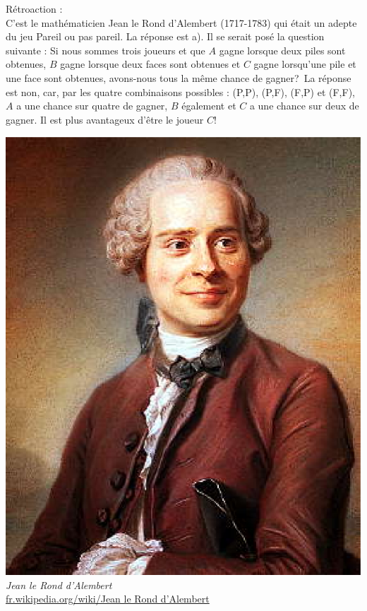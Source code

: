 \documentclass[letterpaper, 12pt]{article}
\begin{document}
R\'etroaction :\\
C'est le math\'ematicien Jean le Rond d'Alembert (1717-1783) qui \'etait un adepte du jeu \og Pareil ou pas pareil\fg. La r\'eponse est a). Il se serait pos\'e la question suivante : \og Si nous sommes trois joueurs et que $A$ gagne lorsque deux piles sont obtenues, $B$ gagne lorsque deux faces sont obtenues et $C$ gagne lorsqu'une pile et une face sont obtenues, avons-nous tous la m\^eme chance de gagner?\fg \ La r\'eponse est non, car, par les quatre combinaisons possibles : (P,P), (P,F), (F,P) et (F,F), $A$ a une chance sur quatre de gagner, $B$ \'egalement et $C$ a une chance sur deux de gagner. Il est plus avantageux d'\^etre le joueur $C$!
\begin{center}
\includegraphics[scale=0.3]{Jean_d'Alembert.eps}\\
\emph{{\small Jean le Rond d'Alembert}}\\
\href{http://fr.wikipedia.org/wiki/Jean_le_Rond_d\%27Alembert}{fr.wikipedia.org/wiki/Jean le Rond d'Alembert}\\[5mm]
\end{center}
\end{document}
